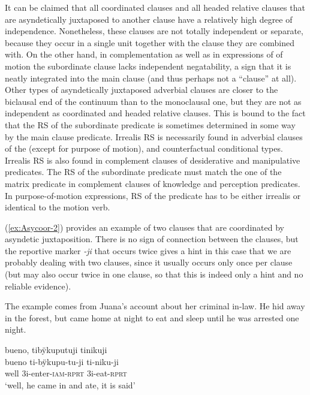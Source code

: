 It can be claimed that all coordinated clauses and all headed relative clauses that are asyndetically juxtaposed to another clause have a relatively high degree of independence. Nonetheless, these clauses are not totally independent or separate, because they occur in a single  unit together with the clause they are combined with. On the other hand, in complementation as well as in expressions of  of motion the subordinate clause lacks independent negatability, a sign that it is neatly integrated into the main clause (and thus perhaps not a “clause” at all). Other types of asyndetically juxtaposed adverbial clauses are closer to the biclausal end of the continuum than to the monoclausal one, but they are not as independent as coordinated and headed relative clauses. This is bound to the fact that the RS of the subordinate predicate is sometimes determined in some way by the main clause predicate. Irrealis RS is necessarily found in adverbial clauses of the  (except for purpose of motion),  and counterfactual conditional types. Irrealis RS is also found in complement clauses of desiderative and manipulative predicates. The RS of the subordinate predicate must match the one of the matrix predicate in complement clauses of knowledge and perception predicates. In purpose-of-motion expressions, RS of the  predicate has to be either irrealis or identical to the motion verb.

(\ref{ex:Asycoor-2}) provides an example of two clauses that are coordinated by asyndetic juxtaposition. There is no sign of connection between the clauses, but the reportive marker \textit{-ji} that occurs twice gives a hint in this case that we are probably dealing with two clauses, since it usually occurs only once per clause (but may also occur twice in one clause, so that this is indeed only a hint and no reliable evidence). 

The example comes from Juana’s account about her criminal in-law. He hid away in the forest, but came home at night to eat and sleep until he was arrested one night.

\ea\label{ex:Asycoor-2}
\begingl
\glpreamble bueno, tibÿkuputuji tinikuji\\
\gla bueno ti-bÿkupu-tu-ji ti-niku-ji\\
\glb well 3i-enter-\textsc{iam}-\textsc{rprt} 3i-eat-\textsc{rprt}\\
\glft ‘well, he came in and ate, it is said’
\endgl
\trailingcitation{[jxx-p120430l-2.147-148]}
\xe


